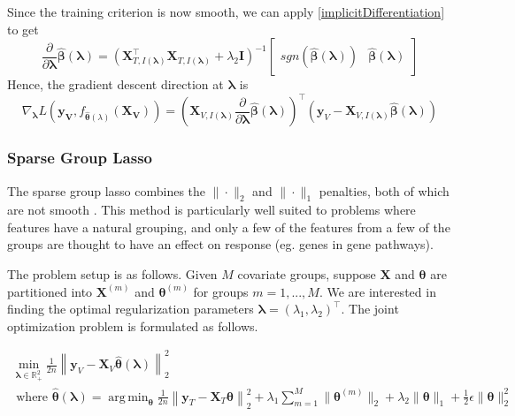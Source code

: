 \documentclass[10pt,letterpaper]{article}
\DeclareMathOperator*{\argmin}{arg\,min}
\begin{document}
Since the training criterion is now smooth, we can apply \eqref{implicitDifferentiation} to get
\begin{equation}
\frac{\partial}{\partial \boldsymbol \lambda} \hat{\boldsymbol{\beta}}(\boldsymbol{\lambda}) = 
\left ( 
\boldsymbol{X}_{T, I(\boldsymbol\lambda)}^\top \boldsymbol{X}_{T, I(\boldsymbol\lambda)} + \lambda_2 \boldsymbol{I}
\right )^{-1}
\begin{bmatrix}
sgn \left (\hat{\boldsymbol{\beta}} (\boldsymbol{\lambda}) \right ) &
\hat{\boldsymbol{\beta}} (\boldsymbol{\lambda})
\end{bmatrix}
\end{equation}
Hence, the gradient descent direction at $\boldsymbol{\lambda}$ is
\begin{equation}
\nabla_{\boldsymbol \lambda} L(\boldsymbol{y_V}, f_{\hat{\boldsymbol{\theta}}(\lambda)}(\boldsymbol{X_V})) =
\left (
\boldsymbol{X}_{V, I(\boldsymbol\lambda)}
\frac{\partial}{\partial \boldsymbol \lambda} \hat{\boldsymbol{\beta}}(\boldsymbol{\lambda})
\right )^{\top}
\left (
\boldsymbol y_V - \boldsymbol{X}_{V, I(\boldsymbol\lambda)} \hat{\boldsymbol{\beta}} (\boldsymbol{\lambda})
\right )
\end{equation}

\subsubsection{Sparse Group Lasso}\label{sec:sgl}

The sparse group lasso combines the $\|\cdot\|_2$ and $\|\cdot\|_1$ penalties, both of which are not smooth \citep{simon2013sparse}. This method is particularly well suited to problems where features have a natural grouping, and only a few of the features from a few of the groups are thought to have an effect on response (eg. genes in gene pathways).

The problem setup is as follows. Given $M$ covariate groups, suppose $\boldsymbol{X}$ and $\boldsymbol \theta$ are partitioned into $\boldsymbol{X}^{(m)}$ and $\boldsymbol \theta^{(m)}$ for groups $m = 1, ... , M$. We are interested in finding the optimal regularization parameters $\boldsymbol{\lambda} = (\lambda_1, \lambda_2)^\top$. The joint optimization problem is formulated as follows.

\begin{equation}
\begin{array}{c}
\min_{\boldsymbol{\lambda} \in \mathbb{R}^2_{+}} \frac{1}{2n}
\left \| \boldsymbol{y}_V - \boldsymbol{X}_V \hat{\boldsymbol{\theta}}(\boldsymbol{\lambda}) \right \|^2_2 \\
\text{ where }
\hat{\boldsymbol{\theta}}(\boldsymbol{\lambda}) =
\argmin_{\boldsymbol{\theta}} \frac{1}{2n} 
\left \| \boldsymbol{y}_T - \boldsymbol{X}_T \boldsymbol{\theta} \right \|^2_2
+ \lambda_1 \sum_{m=1}^M \| \boldsymbol\theta^{(m)} \|_2
+ \lambda_2 \| \boldsymbol\theta \|_1
+ \frac{1}{2} \epsilon \| \boldsymbol\theta \|_2^2
\end{array}
\end{equation}
\end{document}
